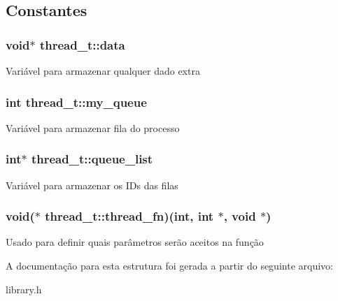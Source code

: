 \subsection{Constantes}
\hypertarget{structthread__t_a757f72629b527b6b5b824e88561c19fe}{
\subsubsection[{data}]{\setlength{\rightskip}{0pt plus 5cm}void$\ast$ {\bf thread\_\-t::data}}}
\label{structthread__t_a757f72629b527b6b5b824e88561c19fe}
Variável para armazenar qualquer dado extra \hypertarget{structthread__t_ae76fa92871d4b1d1d8ef76dbb4f9ba33}{
\subsubsection[{my\_\-queue}]{\setlength{\rightskip}{0pt plus 5cm}int {\bf thread\_\-t::my\_\-queue}}}
\label{structthread__t_ae76fa92871d4b1d1d8ef76dbb4f9ba33}
Variável para armazenar fila do processo \hypertarget{structthread__t_a551de490b7ea93752ec46ce60a241c22}{
\subsubsection[{queue\_\-list}]{\setlength{\rightskip}{0pt plus 5cm}int$\ast$ {\bf thread\_\-t::queue\_\-list}}}
\label{structthread__t_a551de490b7ea93752ec46ce60a241c22}
Variável para armazenar os IDs das filas \hypertarget{structthread__t_af1823bc43b90c985e7dbc7e0a74ff543}{
\subsubsection[{thread\_\-fn}]{\setlength{\rightskip}{0pt plus 5cm}void($\ast$ {\bf thread\_\-t::thread\_\-fn})(int, int $\ast$, void $\ast$)}}
\label{structthread__t_af1823bc43b90c985e7dbc7e0a74ff543}
Usado para definir quais parâmetros serão aceitos na função 

A documentação para esta estrutura foi gerada a partir do seguinte arquivo:\begin{DoxyCompactItemize}
\item 
library.h\end{DoxyCompactItemize}
